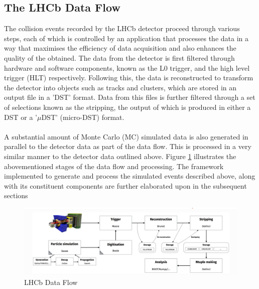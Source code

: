 \subsection{The LHCb Data Flow}\label{LHCbDataFlow}
The collision events recorded by the LHCb detector proceed through various steps, each of which is controlled by an application that processes the data in a way that maximises the efficiency of data acquisition and also enhances the quality of the obtained. The data from the detector is first filtered through hardware and software components, known as the L0 trigger, and the high level trigger (HLT) respectively. Following this, the data is
reconstructed to transform the detector into objects such as tracks and clusters, which are stored in an output file in a 'DST' format. Data from this files is further filtered through a set of selections known as the stripping, the output of which is produced in either a DST or a '$\mu$DST' (micro-DST) format.\\
\\
A substantial amount of Monte Carlo (MC) simulated data is also generated in parallel to the detector data as part of the data flow. This is processed in a very similar manner to the detector data outlined above. Figure \ref{LHCbData} illustrates the abovementioned stages of the data flow and processing. The framework implemented to generate and process the simulated events described above, along with its constituent components are further elaborated upon in the subsequent sections
\begin{figure}[H]
    \centering
    \includegraphics[scale = 0.4]{LHCbDataFlow.jpg}
    \caption{LHCb Data Flow}
    \label{LHCbData}
\end{figure}

